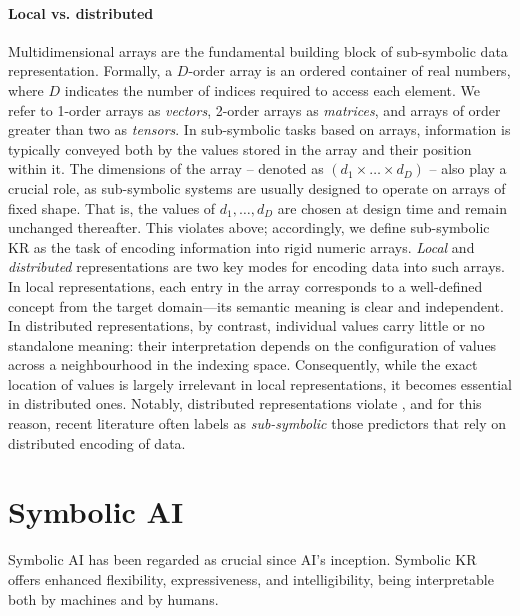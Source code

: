 \paragraph{Local vs. distributed}
%
Multidimensional arrays are the fundamental building block of sub-symbolic data representation.
%
Formally, a $D$-order array is an ordered container of real numbers, where $D$ indicates the number of indices required to access each element.
%
We refer to 1-order arrays as \emph{vectors}, 2-order arrays as \emph{matrices}, and arrays of order greater than two as \emph{tensors}.
%
In sub-symbolic tasks based on arrays, information is typically conveyed both by the values stored in the array and their position within it.
%
The dimensions of the array -- denoted as $(d_1 \times \dots \times d_D)$ -- also play a crucial role, as sub-symbolic systems are usually designed to operate on arrays of fixed shape.
%
That is, the values of $d_1, \dots, d_D$ are chosen at design time and remain unchanged thereafter.
%
This violates  above; accordingly, we define sub-symbolic \gls{KR} as the task of encoding information into rigid numeric arrays.
%
\emph{Local} and \emph{distributed} representations are two key modes for encoding data into such arrays.
%
In local representations, each entry in the array corresponds to a well-defined concept from the target domain---its semantic meaning is clear and independent.
%
In distributed representations, by contrast, individual values carry little or no standalone meaning: their interpretation depends on the configuration of values across a neighbourhood in the indexing space.
%
Consequently, while the exact location of values is largely irrelevant in local representations, it becomes essential in distributed ones.
%
Notably, distributed representations violate , and for this reason, recent literature often labels as \emph{sub-symbolic} those predictors that rely on distributed encoding of data.


\section{Symbolic \Gls{AI}}\label{sec:symbolic-ai}
%
Symbolic \gls{AI} has been regarded as crucial since \gls{AI}'s inception.
%
Symbolic \gls{KR} offers enhanced flexibility, expressiveness, and intelligibility, being interpretable both by machines and by humans.

